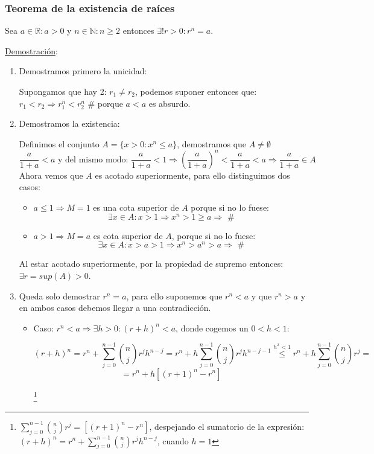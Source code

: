 \documentclass[10pt,a4paper,openright]{book}
\theoremstyle{break}
\begin{document}
\subsubsection{Teorema de la existencia de raíces}
Sea $a\in \mathbb R: a>0$ y $n\in \mathbb N: n\geq 2$ entonces $\exists! r>0: r^n=a$.\par
\underline{Demostración}:\par
\begin{enumerate}
\item Demostramos primero la unicidad:\par
Supongamos que hay 2: $r_1\neq r_2$, podemos suponer entonces que: $r_1<r_2\Rightarrow r_1^n<r_2^n$ \# porque $a<a$ es absurdo.

\item Demostramos la existencia:\par 
Definimos el conjunto $A=\{x>0: x^n\leq a\}$, demostramos que $A\neq \emptyset$
$$\frac{a}{1+a}<a\mbox{ y del mismo modo: }\frac{a}{1+a}<1\Rightarrow \left(\frac{a}{1+a}\right)^n<\frac{a}{1+a}<a\Rightarrow \frac{a}{1+a}\in A$$
Ahora vemos que $A$ es acotado superiormente, para ello distinguimos dos casos:
	\begin{itemize}
	\item $a\leq 1\Rightarrow M=1$ es una cota superior de $A$ porque si no lo fuese:
$$\exists x\in A: x>1\Rightarrow x^n>1\geq a\Rightarrow \mbox{ \#}$$

	\item  $a>1\Rightarrow M=a$ es cota superior de $A$, porque si no lo fuese:
$$\exists x\in A: x>a>1 \Rightarrow x^n>a^n>a\Rightarrow\mbox{ \#}$$
	\end{itemize}

Al estar acotado superiormente, por la propiedad de supremo entonces: $\exists r=sup(A)>0$.
\item Queda solo demostrar $r^n=a$, para ello suponemos que $r^n<a$ y que $r^n>a$ y en ambos casos debemos llegar a una contradicción.
	\begin{itemize}
	\item Caso: $r^n<a\Rightarrow \exists h>0: (r+h)^n<a$, donde cogemos un $0<h<1$:
	
$$(r+h)^n=r^n+\sum_{j=0}^{n-1}\binom{n}{j}r^jh^{n-j}=r^n+h\sum_{j=0}^{n-1}\binom{n}{j}r^jh^{n-j-1}\stackrel{h^x<1}{\leq}r^n+h\sum_{j=0}^{n-1}\binom{n}{j}r^j=$$
$$=r^n+h\left[(r+1)^n-r^n\right]$$

\footnote{$\sum_{j=0}^{n-1}\binom{n}{j}r^j=\left[(r+1)^n-r^n\right]$, despejando el sumatorio de la expresión: $(r+h)^n=r^n+\sum_{j=0}^{n-1}\binom{n}{j}r^jh^{n-j}$, cuando $h=1$}


\end{itemize}
\end{enumerate}
\end{document}
